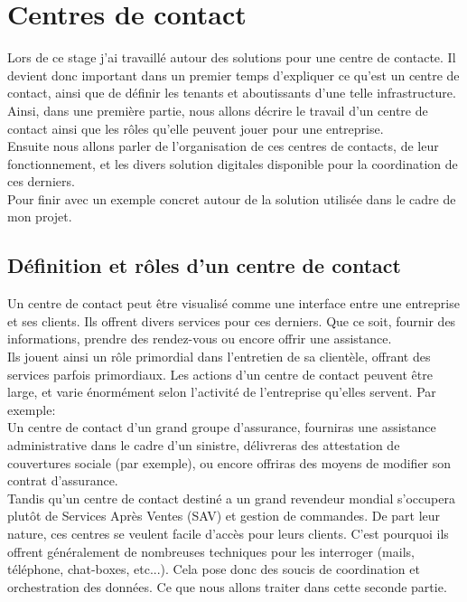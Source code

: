 \documentclass{rapport}
\begin{document}
\newpage

\section{Centres de contact}

Lors de ce stage j'ai travaillé autour des solutions pour une centre de contacte. Il devient donc important dans un premier temps d'expliquer ce qu'est un centre de contact, ainsi que de définir les tenants et aboutissants d'une telle infrastructure.\\
Ainsi, dans une première partie, nous allons décrire le travail d'un centre de contact ainsi que les rôles qu'elle peuvent jouer pour une entreprise.\\
Ensuite nous allons parler de l'organisation de ces centres de contacts, de leur fonctionnement, et les divers solution digitales disponible pour la coordination de ces derniers.\\
Pour finir avec un exemple concret autour de la solution utilisée dans le cadre de mon projet.

\subsection{Définition et rôles d'un centre de contact}

Un centre de contact peut être visualisé comme une interface entre une entreprise et ses clients. Ils offrent divers services pour ces derniers. Que ce soit, fournir des informations, prendre des rendez-vous ou encore offrir une assistance.\\

Ils jouent ainsi un rôle primordial dans l'entretien de sa clientèle, offrant des services parfois primordiaux.
Les actions d'un centre de contact peuvent être large, et varie énormément selon l'activité de l'entreprise qu'elles servent. Par exemple:\\

Un centre de contact d'un grand groupe d'assurance, fourniras une assistance administrative dans le cadre d'un sinistre, délivreras des attestation de couvertures sociale (par exemple), ou encore offriras des moyens de modifier son contrat d'assurance.\\

Tandis qu'un centre de contact destiné a un grand revendeur mondial s'occupera plutôt de Services Après Ventes (SAV) et gestion de commandes.
De part leur nature, ces centres se veulent facile d'accès pour leurs clients. C'est pourquoi ils offrent généralement de nombreuses techniques pour les interroger (mails, téléphone, chat-boxes, etc...). Cela pose donc des soucis de coordination et orchestration des données.
Ce que nous allons traiter dans cette seconde partie.
\end{document}
